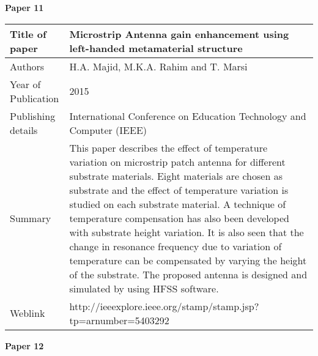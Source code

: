 \documentclass[12pt]{article}
\begin{document}
		    \cleardoublepage
		    
		    	\begin{flushleft}
		    		\textbf{Paper 11}
		    	\end{flushleft}
		    	

		      \begin{center}
		      	\begin{table}[H]
		      		\centering
		      		\begin{tabular}{ |l|p{11cm}| }
		      			\hline
		      			Title of paper &  Microstrip Antenna gain enhancement using left-handed metamaterial structure \\
		      			\hline
		      			Authors & H.A. Majid, M.K.A. Rahim and T. Marsi \\
		      			\hline
		      			Year of Publication & 2015 \\
		      			\hline
		      			Publishing details & International Conference on Education Technology and Computer (IEEE) \\ \hline
		      			Summary & This paper describes the effect of temperature variation on microstrip patch antenna for different substrate materials. Eight materials are chosen as substrate and the effect of temperature variation is studied on each substrate material. A technique of temperature compensation has also been developed with substrate height variation. It is also seen that the change in resonance frequency due to variation of temperature can be compensated by varying the height of the substrate. The proposed antenna is designed and simulated by using HFSS software.\\
		      			\hline
		      			Weblink & http://ieeexplore.ieee.org/stamp/stamp.jsp?tp=arnumber=5403292 \\
		      			\hline			 
		      		\end{tabular}		
		      		
		      	\end{table}
		      \end{center}
		      
		      	\begin{flushleft}
		      		\textbf{Paper 12}
		      	\end{flushleft}
		      	
\end{document}
